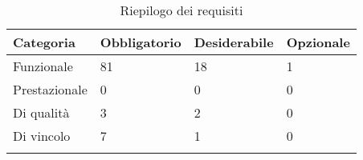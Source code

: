 
				\begin{longtabu} spread 1cm [c]{|X[-1,l]|X[-1,l]|X[-1,l]|X[-1,l]|}
					\hline
					\rowfont{\bf \centering}
					Categoria &
					Obbligatorio &
					Desiderabile &
					Opzionale \\
					\hline
					\endhead
					
					Funzionale & 81 & 18 & 1 \\ \hline Prestazionale & 0 & 0 & 0 \\ \hline Di qualità & 3 & 2 & 0 \\ \hline Di vincolo & 7 & 1 & 0 \\ \hline                 \caption{Riepilogo dei requisiti}
				\end{longtabu}